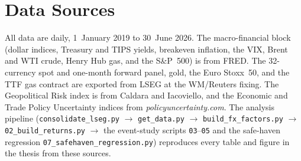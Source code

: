 
\chapter{Data Sources}
\label{ch:data_sources}

All data are daily, 1~January 2019 to 30~June 2026. The macro-financial block (dollar
indices, Treasury and TIPS yields, breakeven inflation, the VIX, Brent and WTI crude, Henry
Hub gas, and the S\&P~500) is from FRED. The 32-currency spot and one-month forward panel,
gold, the Euro Stoxx~50, and the TTF gas contract are exported from LSEG at the WM/Reuters
fixing. The Geopolitical Risk index is from Caldara and Iacoviello, and the Economic and
Trade Policy Uncertainty indices from \textit{policyuncertainty.com}. The analysis pipeline
(\texttt{consolidate\_lseg.py} $\to$ \texttt{get\_data.py} $\to$ \texttt{build\_fx\_factors.py}
$\to$ \texttt{02\_build\_returns.py} $\to$ the event-study scripts \texttt{03}--\texttt{05}
and the safe-haven regression \texttt{07\_safehaven\_regression.py})
reproduces every table and figure in the thesis from these sources.
